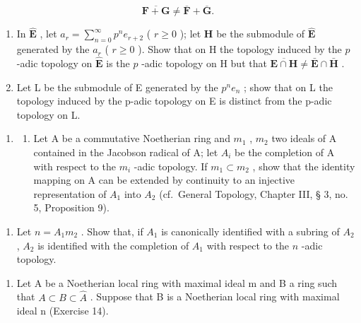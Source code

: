 \[
\overline {{{\mathbf {F} + \mathbf {G}}}} \neq \overline {{{\mathbf {F}}}} + \overline {{{\mathbf {G}}}}.
\]

\begin{enumerate}
\def\labelenumi{(\alph{enumi})}
\setcounter{enumi}{2}
\item
  In \(\hat{\mathbf{E}}\) , let \(a_{r} = \sum_{n=0}^{\infty} p^{n} e_{r+2}\) ( \(r \geqslant 0\) ); let \(\mathbf{H}\) be the submodule of \(\hat{\mathbf{E}}\) generated by the \(a_{r}\) ( \(r \geqslant 0\) ). Show that on H the topology induced by the \(p\) -adic topology on \(\hat{\mathbf{E}}\) is the \(p\) -adic topology on H but that \(\overline{\mathbf{E} \cap \mathbf{H}} \neq \bar{\mathbf{E}} \cap \bar{\mathbf{H}}\) .
\item
  Let L be the submodule of E generated by the \(p^{n}e_{n}\) ; show that on L the topology induced by the p-adic topology on E is distinct from the p-adic topology on L.
\end{enumerate}

\begin{enumerate}
\def\labelenumi{\arabic{enumi}.}
\setcounter{enumi}{11}
\tightlist
\item
  \begin{enumerate}
  \def\labelenumii{(\alph{enumii})}
  \tightlist
  \item
    Let A be a commutative Noetherian ring and \(m_{1}\) , \(m_{2}\) two ideals of A contained in the Jacobson radical of A; let \(A_{i}\) be the completion of A with respect to the \(m_{i}\) -adic topology. If \(m_{1} \subset m_{2}\) , show that the identity mapping on A can be extended by continuity to an injective representation of \(A_{1}\) into \(A_{2}\) (cf.~General Topology, Chapter III, § 3, no. 5, Proposition 9).
  \end{enumerate}
\end{enumerate}

\begin{enumerate}
\def\labelenumi{(\alph{enumi})}
\setcounter{enumi}{1}
\tightlist
\item
  Let \(n = A_1 m_2\) . Show that, if \(A_1\) is canonically identified with a subring of \(A_2\) , \(A_2\) is identified with the completion of \(A_1\) with respect to the \(n\) -adic topology.
\end{enumerate}

\begin{enumerate}
\def\labelenumi{\arabic{enumi}.}
\setcounter{enumi}{12}
\tightlist
\item
  Let A be a Noetherian local ring with maximal ideal m and B a ring such that \(A \subset B \subset \hat{A}\) . Suppose that B is a Noetherian local ring with maximal ideal n (Exercise 14).
\end{enumerate}

